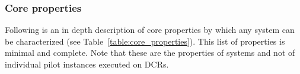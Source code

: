 \documentclass{sig-alternate}
\begin{document}

\subsubsection{Core properties}
\label{sec:coreprops}



Following is an in depth description of core properties by which any \pilot
system can be characterized (see Table~\ref{table:core_properties}). This list
of properties is minimal and complete. Note that these are the properties of
\pilot systems and not of individual pilot instances executed on DCRs.
\end{document}
